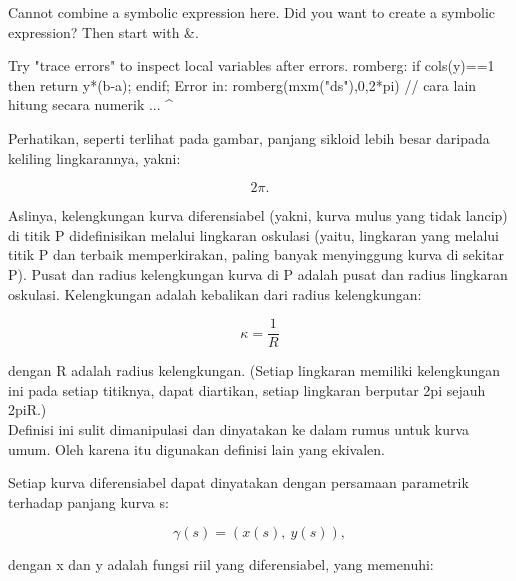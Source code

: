 \documentclass{article}
\begin{document}
\begin{eulernotebook}
\begin{eulercomment}
\begin{eulercomment}
\begin{eulercomment}
\begin{eulercomment}
\begin{euleroutput}
  Cannot combine a symbolic expression here.
  Did you want to create a symbolic expression?
  Then start with &.
  
  Try "trace errors" to inspect local variables after errors.
  romberg:
      if cols(y)==1 then return y*(b-a); endif;
  Error in:
  romberg(mxm("ds"),0,2*pi) // cara lain hitung secara numerik ...
                           ^
\end{euleroutput}
\begin{eulercomment}
Perhatikan, seperti terlihat pada gambar, panjang sikloid lebih besar
daripada keliling lingkarannya, yakni:

\end{eulercomment}
\begin{eulerformula}
\[
2\pi.
\]
\end{eulerformula}
\begin{eulercomment}
Aslinya, kelengkungan kurva diferensiabel (yakni, kurva mulus yang
tidak lancip) di titik P didefinisikan melalui lingkaran oskulasi
(yaitu, lingkaran yang melalui titik P dan terbaik memperkirakan,
paling banyak menyinggung kurva di sekitar P). Pusat dan radius
kelengkungan kurva di P adalah pusat dan radius lingkaran oskulasi.
Kelengkungan adalah kebalikan dari radius kelengkungan:

\end{eulercomment}
\begin{eulerformula}
\[
\kappa =\frac {1}{R}
\]
\end{eulerformula}
\begin{eulercomment}
dengan R adalah radius kelengkungan. (Setiap lingkaran memiliki
kelengkungan ini pada setiap titiknya, dapat diartikan, setiap
lingkaran berputar 2pi sejauh 2piR.)\\
Definisi ini sulit dimanipulasi dan dinyatakan ke dalam rumus untuk
kurva umum. Oleh karena itu digunakan definisi lain yang ekivalen.

\end{eulercomment}
\begin{eulercomment}
Setiap kurva diferensiabel dapat dinyatakan dengan persamaan
parametrik terhadap panjang kurva s:

\end{eulercomment}
\begin{eulerformula}
\[
\gamma(s) = (x(s),\ y(s)),
\]
\end{eulerformula}
\begin{eulercomment}
dengan x dan y adalah fungsi riil yang diferensiabel, yang memenuhi:


\end{eulercomment}
\end{eulercomment}
\end{eulercomment}
\end{eulercomment}
\end{eulercomment}
\end{eulernotebook}
\end{document}
